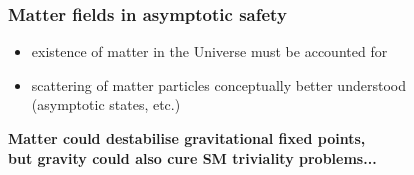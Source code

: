 \documentclass[]{beamer}  %
\begin{document}
\begin{frame}
  \frametitle{Matter fields in asymptotic safety}

  \fontsize{8pt}{7.2}\selectfont
  \begin{itemize}
    \item existence of matter in the Universe must be accounted for\\[3pt]
    \item scattering of matter particles conceptually better understood\\ (asymptotic states, etc.)
  \end{itemize}

  \fontsize{10pt}{7.2}\selectfont
  \begin{center}
    \textbf{
      Matter could destabilise gravitational fixed points,\\
      but gravity could also cure SM triviality problems...
    }
  \end{center}


\end{frame}
\end{document}

